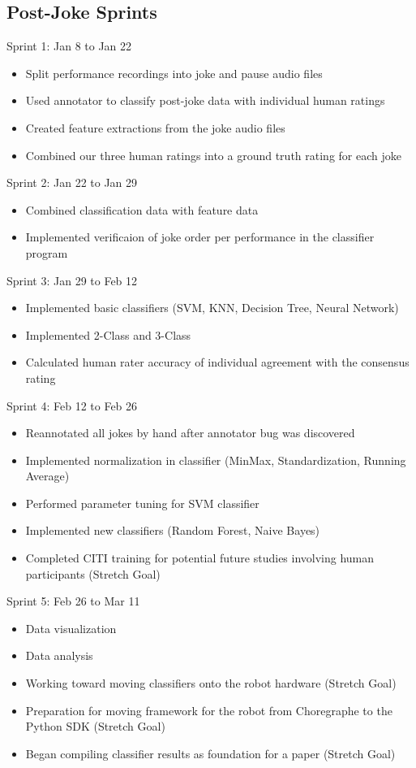 \documentclass[onecolumn, draftclsnofoot,10pt, compsoc]{IEEEtran}
\begin{document}
\subsection{Post-Joke Sprints}

Sprint 1: Jan 8 to Jan 22
\begin{itemize}
\item Split performance recordings into joke and pause audio files
\item Used annotator to classify post-joke data with individual human ratings
\item Created feature extractions from the joke audio files
\item Combined our three human ratings into a ground truth rating for each joke
\end{itemize}

Sprint 2: Jan 22 to Jan 29
\begin{itemize}
\item Combined classification data with feature data
\item Implemented verificaion of joke order per performance in the classifier program
\end{itemize}

Sprint 3: Jan 29 to Feb 12
\begin{itemize}
\item Implemented basic classifiers (SVM, KNN, Decision Tree, Neural Network)
\item Implemented 2-Class and 3-Class
\item Calculated human rater accuracy of individual agreement with the consensus rating
\end{itemize}

Sprint 4: Feb 12 to Feb 26
\begin{itemize}
\item Reannotated all jokes by hand after annotator bug was discovered
\item Implemented normalization in classifier (MinMax, Standardization, Running Average)
\item Performed parameter tuning for SVM classifier
\item Implemented new classifiers (Random Forest, Naive Bayes)
\item Completed CITI training for potential future studies involving human participants (Stretch Goal)
\end{itemize}

Sprint 5: Feb 26 to Mar 11
\begin{itemize}
\item Data visualization
\item Data analysis
\item Working toward moving classifiers onto the robot hardware (Stretch Goal)
\item Preparation for moving framework for the robot from Choregraphe to the Python SDK (Stretch Goal)
\item Began compiling classifier results as foundation for a paper (Stretch Goal)
\end{itemize}
\end{document}
